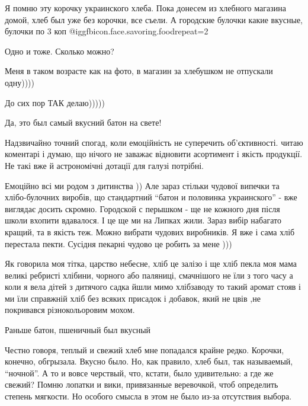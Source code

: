 \begin{itemize}

Я помню эту корочку украинского хлеба. Пока донесем из хлебного магазина домой,
хлеб был уже без корочки, все съели. А городские булочки какие вкусные, булочки по
3 коп @igg{fbicon.face.savoring.food}{repeat=2} 


Одно и тоже. Сколько можно?

Меня в таком возрасте как на фото, в магазин за хлебушком не отпускали одну))))

До сих пор ТАК делаю)))))

Да, это был самый вкусний батон на свете!


Надзвичайно точний спогад, коли емоційність не суперечить об'єктивності. читаю
коментарі і думаю, що нічого не заважає відновити асортимент і якість
продукції. Не такі вже й астрономічні дотації для галузі потрібні.


Емоційно всі ми родом з дитинства )) Але зараз стільки чудової випечки та
хлібо-булочних виробів, що стандартний \enquote{батон и половинка украинского} - вже
виглядає досить скромно. Городской с перышком - ще не кожного дня після школи
вхопити вдавалося. І це ще ми на Липках жили. Зараз вибір набагато кращий, та в
якість теж. Можно вибрати чудових виробників. Я вже і сама хліб перестала
пекти. Сусідня пекарні чудово це робить за мене )))


Як говорила моя тітка, царство небесне, хліб це залізо і ще хліб пекла моя мама
великі ребристі хлібини, чорного або паляниці, смачнішого не їли з того часу а
коли я вела дітей з дитячого садка йшли мимо хлібзаводу то такий аромат стояв і
ми їли справжній хліб без всяких присадок і добавок, який не цвів ,не покривався
різнокольоровим мохом.

Раньше батон, пшеничный был вкусный


Честно говоря, теплый и свежий хлеб мне попадался крайне редко. Корочки,
конечно, обгрызала. Вкусно было. Но, как правило, хлеб был, так называемый,
\enquote{ночной}. А то и вовсе черствый, что, кстати, было удивительно: а где же
свежий? Помню лопатки и вики, привязанные веревочкой, чтоб определить степень
мягкости. Но особого смысла в этом не было из-за отсутствия выбора.



\end{itemize}
